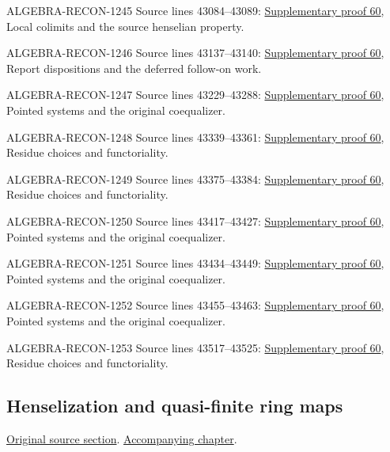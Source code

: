 \begin{AlgebraSourceRoutes}
\item[ALGEBRA-RECON-1245] Source lines 43084--43089: \hyperlink{algebra_henselization_notes_20260929}{Supplementary proof 60}, Local colimits and the source henselian property.
\item[ALGEBRA-RECON-1246] Source lines 43137--43140: \hyperlink{algebra_henselization_notes_20260929}{Supplementary proof 60}, Report dispositions and the deferred follow-on work.
\item[ALGEBRA-RECON-1247] Source lines 43229--43288: \hyperlink{algebra_henselization_notes_20260929}{Supplementary proof 60}, Pointed systems and the original coequalizer.
\item[ALGEBRA-RECON-1248] Source lines 43339--43361: \hyperlink{algebra_henselization_notes_20260929}{Supplementary proof 60}, Residue choices and functoriality.
\item[ALGEBRA-RECON-1249] Source lines 43375--43384: \hyperlink{algebra_henselization_notes_20260929}{Supplementary proof 60}, Residue choices and functoriality.
\item[ALGEBRA-RECON-1250] Source lines 43417--43427: \hyperlink{algebra_henselization_notes_20260929}{Supplementary proof 60}, Pointed systems and the original coequalizer.
\item[ALGEBRA-RECON-1251] Source lines 43434--43449: \hyperlink{algebra_henselization_notes_20260929}{Supplementary proof 60}, Pointed systems and the original coequalizer.
\item[ALGEBRA-RECON-1252] Source lines 43455--43463: \hyperlink{algebra_henselization_notes_20260929}{Supplementary proof 60}, Pointed systems and the original coequalizer.
\item[ALGEBRA-RECON-1253] Source lines 43517--43525: \hyperlink{algebra_henselization_notes_20260929}{Supplementary proof 60}, Residue choices and functoriality.
\end{AlgebraSourceRoutes}

\subsection{Henselization and quasi-finite ring maps}
\hypertarget{algebra-source-section-henselization-quasi-finite}{}
\noindent\href{https://github.com/stacks/stacks-project/blob/a04446e57ec1fbc252a871afcec7752fb2807b14/algebra.tex\#L43573}{Original source section}. \href{algebra.pdf\#nameddest=section-henselization-quasi-finite}{Accompanying chapter}.

